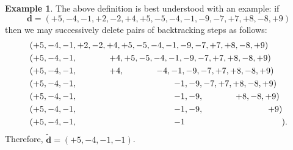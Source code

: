 \documentclass[11pt]{amsart}
\theoremstyle{definition}
\newtheorem{example}[theorem]{Example}
\renewcommand{\d}{\boldsymbol{d}}
\newcommand{\Redd}{\widetilde{\d}}
\begin{document}
\begin{example}
\label{ex:backtracking}
The above definition is best understood with an example: if
\begin{equation*}
\d = (+5,-4, -1, {+2}, {-2}, {+4}, {+5}, {-5}, {-4}, -1, {-9}, {-7}, {+7}, {+8}, {-8}, {+9} )
\end{equation*}
then we may successively delete pairs of backtracking steps as follows:
\begin{align*}
&(+5,-4, -1, {+2}, {-2}, {+4}, {+5}, {-5}, {-4}, -1, {-9}, {-7}, {+7},{+8},{-8},{+9} )  \\
&(+5,-4, -1, \hspace{1.327cm} {+4},{+5}, {-5}, {-4}, -1, {-9}, {-7}, {+7},{+8},{-8},{+9} )  \\
&(+5,-4, -1, \hspace{1.327cm} {+4},\hspace{1.327cm} {-4}, -1, {-9}, {-7}, {+7},{+8},{-8},{+9} )  \\
&(+5,-4, -1, \hspace{1.327cm} \hspace{1.327cm}\hspace{1.327cm} -1, {-9}, {-7}, {+7},{+8},{-8},{+9} )  \\
&(+5,-4, -1,\hspace{1.327cm} \hspace{1.327cm}\hspace{1.327cm} -1, {-9}, \hspace{1.327cm}{+8},{-8},{+9} )  \\
&(+5,-4, -1, \hspace{1.327cm}\hspace{1.327cm}\hspace{1.327cm} -1, {-9}, \hspace{1.327cm}\hspace{1.327cm}{+9} )  \\
&(+5,-4, -1, \hspace{1.327cm}\hspace{1.327cm}\hspace{1.327cm} -1 \hspace{1.327cm}\hspace{1.327cm}\hspace{1.327cm} ).  \\
\end{align*}
Therefore, $\Redd = (+5,-4, -1, -1)$.
\end{example}
\end{document}
